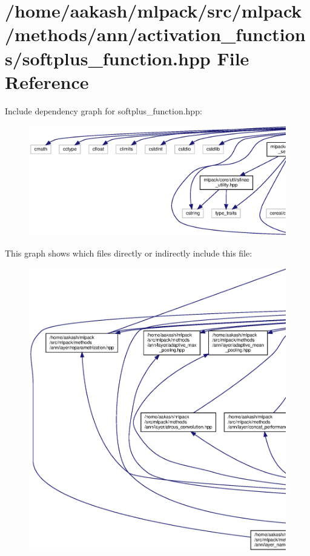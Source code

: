 \section{/home/aakash/mlpack/src/mlpack/methods/ann/activation\+\_\+functions/softplus\+\_\+function.hpp File Reference}
\label{softplus__function_8hpp}
Include dependency graph for softplus\+\_\+function.\+hpp\+:
\nopagebreak
\begin{figure}[H]
\begin{center}
\leavevmode
\includegraphics[width=350pt]{softplus__function_8hpp__incl}
\end{center}
\end{figure}
This graph shows which files directly or indirectly include this file\+:
\nopagebreak
\begin{figure}[H]
\begin{center}
\leavevmode
\includegraphics[width=350pt]{softplus__function_8hpp__dep__incl}
\end{center}
\end{figure}
